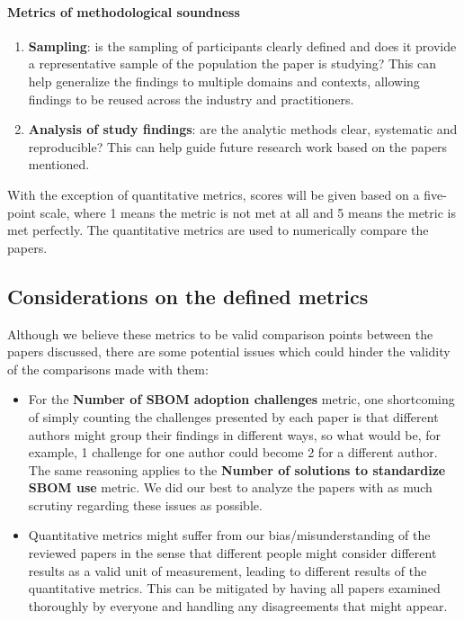 \paragraph{Metrics of methodological soundness}
\begin{enumerate}
    \setcounter{enumi}{\value{metrics}}
    \item \textbf{Sampling}: is the sampling of participants clearly defined and does it provide a representative sample of the population the paper is studying? This can help generalize the findings to multiple domains and contexts, allowing findings to be reused across the industry and practitioners.
    \item \textbf{Analysis of study findings}: are the analytic methods clear, systematic and reproducible? This can help guide future research work based on the papers mentioned.
          \setcounter{metrics}{\value{enumi}}
\end{enumerate}


\noindent With the exception of quantitative metrics, scores will be given based on a five-point scale, where 1 means the metric is not met at all and 5 means the metric is met perfectly. The quantitative metrics are used to numerically compare the papers.

\subsection{Considerations on the defined metrics}

\noindent Although we believe these metrics to be valid comparison points between the papers discussed, there are some potential issues which could hinder the validity of the comparisons made with them:
\begin{itemize}
    \item For the \textbf{Number of SBOM adoption challenges} metric, one shortcoming of simply counting the challenges presented by each paper is that different authors might group their findings in different ways, so what would be, for example, 1 challenge for one author could become 2 for a different author. The same reasoning applies to the \textbf{Number of solutions to standardize SBOM use} metric. We did our best to analyze the papers with as much scrutiny regarding these issues as possible.
    \item Quantitative metrics might suffer from our bias/misunderstanding of the reviewed papers in the sense that different people might consider different results as a valid unit of measurement, leading to different results of the quantitative metrics. This can be mitigated by having all papers examined thoroughly by everyone and handling any disagreements that might appear.
\end{itemize}